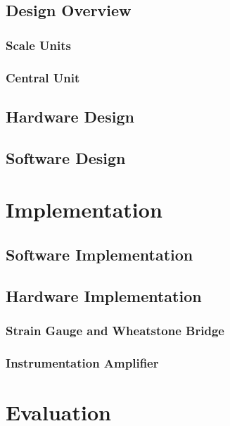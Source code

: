 \documentclass{l3proj}
\begin{document}
\section{Design Overview}

\subsection{Scale Units}
\label{scale}

\subsection{Central Unit}
\label{central}


\label{Block Diagram}
\section{Hardware Design}


\section{Software Design}

\chapter{Implementation}
\label{impl}
\section{Software Implementation}

\section{Hardware Implementation}

\subsection{Strain Gauge and Wheatstone Bridge}

\subsection{Instrumentation Amplifier}
\label{ina}


\chapter{Evaluation}

\end{document}
